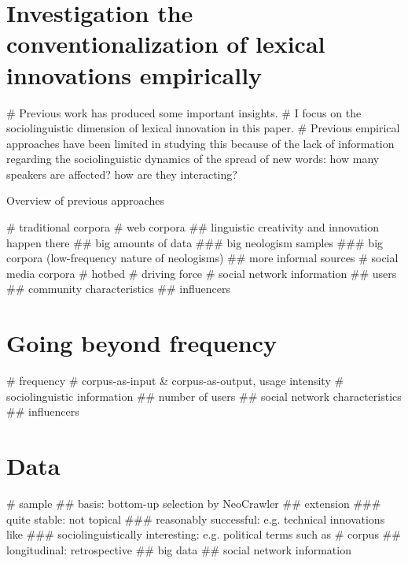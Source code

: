 \documentclass[
  a4paper,
  ]{scrartcl}
\begin{document}
\section{Investigation the conventionalization of lexical innovations empirically}

  \begin{easylist}[itemize]
    # Previous work has produced some important insights.
    # I focus on the sociolinguistic dimension of lexical innovation in this paper.
    # Previous empirical approaches have been limited in studying this because of the lack of information regarding the sociolinguistic dynamics of the spread of new words: how many speakers are affected? how are they interacting?
  \end{easylist}

  Overview of previous approaches

    \begin{easylist}[itemize]
      # traditional corpora \parencite{Elsen2004}
      # web corpora \cite{Renouf2006,Kerremans2012}
        ## linguistic creativity and innovation happen there
        ## big amounts of data
          ### big neologism samples
          ### big corpora (low-frequency nature of neologisms)
        ## more informal sources
      # social media corpora \cite{Grieve2016,Eisenstein2014}
        # hotbed
        # driving force
        # social network information
          ## users
          ## community characteristics
          ## influencers
    \end{easylist}

\section{Going beyond frequency}

  \begin{easylist}[itemize]
    # frequency
    # corpus-as-input \& corpus-as-output, usage intensity \parencite{Stefanowitsch2017}
    # sociolinguistic information
      ## number of users
      ## social network characteristics
      ## influencers
  \end{easylist}

\section{Data}

  \begin{easylist}[itemize]
    # sample
      ## basis: bottom-up selection by NeoCrawler \parencite{Kerremans2018}
      ## extension
        ### quite stable: not topical
        ### reasonably successful: e.g. technical innovations like 
        ### sociolinguistically interesting: e.g. political terms such as 
    # corpus
      ## longitudinal: retrospective
      ## big data
      ## social network information
  \end{easylist}
\end{document}

